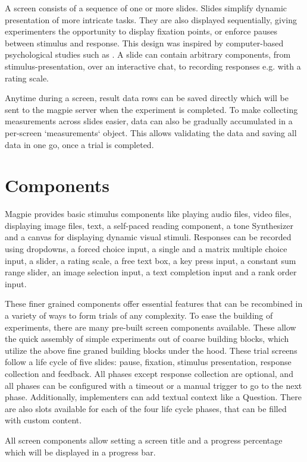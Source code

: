 \documentclass[a4paper,11pt]{scrreprt}
\begin{document}
A screen consists of a sequence of one or more slides. Slides simplify dynamic presentation of more intricate tasks. They are also displayed sequentially, giving experimenters the opportunity to display fixation points, or enforce pauses between stimulus and response. This design was inspired by computer-based psychological studies such as \cite{Todd2004}. A slide can contain arbitrary components, from stimulus-presentation, over an interactive chat, to recording responses e.g. with a rating scale.

Anytime during a screen, result data rows can be saved directly which will be sent to the magpie server when the experiment is completed. To make collecting measurements across slides easier, data can also be gradually accumulated in a per-screen `measurements` object. This allows validating the data and saving all data in one go, once a trial is completed.

\section{Components}
Magpie provides basic stimulus components like playing audio files, video files, displaying image files, text, a self-paced reading component, a tone Synthesizer and a canvas for displaying dynamic visual stimuli. Responses can be recorded using dropdowns, a forced choice input, a single and a matrix multiple choice input, a slider, a rating scale, a free text box, a key press input, a constant sum range slider, an image selection input, a text completion input and a rank order input.

These finer grained components offer essential features that can be recombined in a variety of ways to form trials of any complexity.
To ease the building of experiments, there are many pre-built screen components available. These allow the quick assembly of simple experiments out of coarse building blocks, which utilize the above fine graned building blocks under the hood. These trial screens follow a life cycle of five slides: pause, fixation, stimulus presentation, response collection and feedback. All phases except response collection are optional, and all phases can be configured with a timeout or a manual trigger to go to the next phase. Additionally, implementers can add textual context like a Question. There are also slots available for each of the four life cycle phases, that can be filled with custom content.

All screen components allow setting a screen title and a progress percentage which will be displayed in a progress bar.
\end{document}
